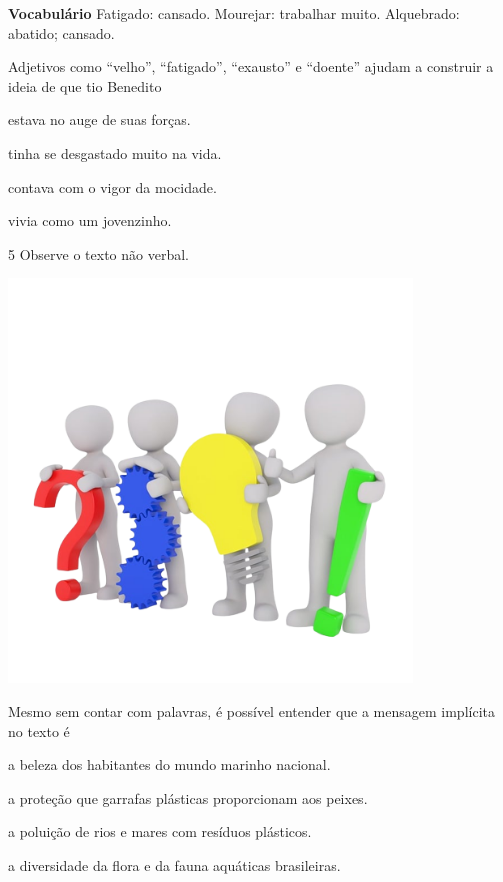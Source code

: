 \textbf{Vocabulário}
Fatigado: cansado.
Mourejar: trabalhar muito.
Alquebrado: abatido; cansado.

Adjetivos como ``velho'', ``fatigado'', ``exausto'' e ``doente'' ajudam a construir a ideia de que tio Benedito

\begin{escolha}
\item estava no auge de suas forças.

\item tinha se desgastado muito na vida.

\item contava com o vigor da mocidade.

\item vivia como um jovenzinho.
\end{escolha}

\num{5} Observe o texto não verbal.

\includegraphics[width=4.21875in,height=4.21875in]{media/image4.png}

Mesmo sem contar com palavras, é possível entender que a mensagem
implícita no texto é

\begin{escolha}
\item a beleza dos habitantes do mundo marinho nacional.

\item a proteção que garrafas plásticas proporcionam aos peixes.

\item a poluição de rios e mares com resíduos plásticos.

\item a diversidade da flora e da fauna aquáticas brasileiras.
\end{escolha}


